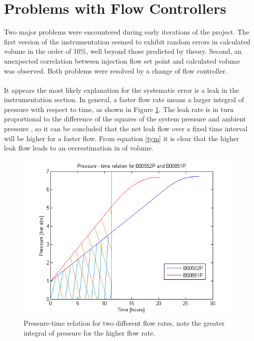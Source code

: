 \documentclass{report}
\begin{document}
\section{Problems with Flow Controllers}
Two major problems were encountered during early iterations of the project. 
The first version of the instrumentation seemed to exhibit random errors in calculated volume in the order of 10\%, well beyond those predicted by theory. Second, an unexpected correlation between injection flow set point and calculated volume was observed. 
Both problems were resolved by a change of flow controller. \\ \\
It appears the most likely explanation for the systematic error is a leak in the instrumentation section. In general, a faster flow rate means a larger integral of pressure with respect to time, as shown in Figure \ref{both}. The leak rate is in turn proportional to the difference of the squares of the system pressure and ambient pressure \cite{leakPaola}, so it can be concluded that the net leak flow over a fixed time interval will be higher for a faster flow. From equation \ref{tym} it is clear that the higher leak flow leads to an overestimation in of volume.  
\begin{figure}[h]
\includegraphics[width = \textwidth]{both}
\caption{Pressure-time relation for two different flow rates, note the greater integral of pressure for the higher flow rate.}
\label{both}
\end{figure}
\end{document}
